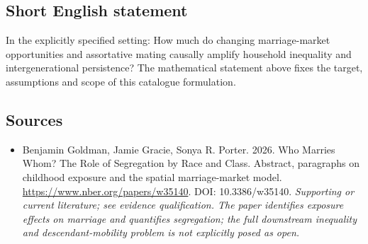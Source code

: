 \documentclass[11pt]{article}
\begin{document}
\subsection{Short English statement}
In the explicitly specified setting: How much do changing marriage-market opportunities and assortative mating causally amplify household inequality and intergenerational persistence? The mathematical statement above fixes the target, assumptions and scope of this catalogue formulation.

\subsection{Sources}
\begin{itemize}\raggedright
\item[\textnormal{[S1]}]\hypertarget{source:30007649:1}{} Benjamin Goldman, Jamie Gracie, Sonya R. Porter. 2026. Who Marries Whom? The Role of Segregation by Race and Class. Abstract, paragraphs on childhood exposure and the spatial marriage-market model.
\url{https://www.nber.org/papers/w35140}.
DOI: 10.3386/w35140.
{\small\textit{Supporting or current literature; see evidence qualification. The paper identifies exposure effects on marriage and quantifies segregation; the full downstream inequality and descendant-mobility problem is not explicitly posed as open.}}
\end{itemize}
\end{document}
